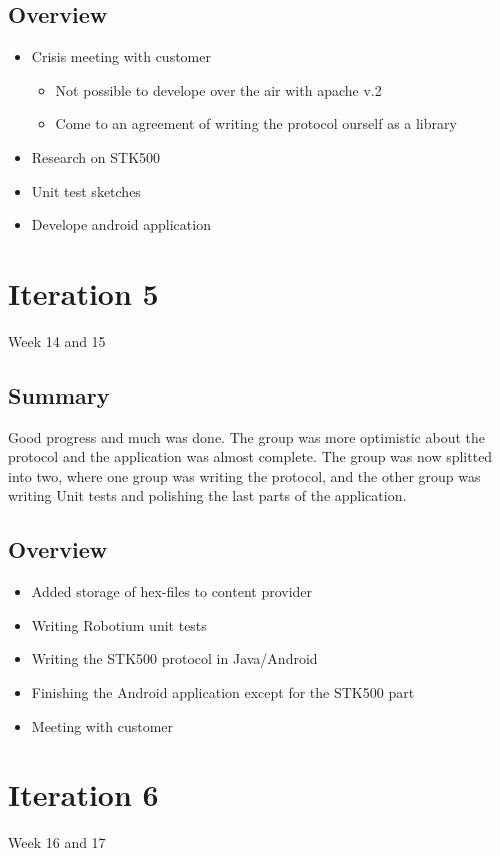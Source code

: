 \subsection{Overview}
\begin{itemize}
	\item{Crisis meeting with customer}
	\begin{itemize}
		\item{Not possible to develope over the air with apache v.2}
		\item{Come to an agreement of writing the protocol ourself as a library}
	\end{itemize}
	\item{Research on STK500}
	\item{Unit test sketches}
	\item{Develope android application}
\end{itemize}

\section{Iteration 5}
Week 14 and 15
\subsection{Summary}
	Good progress and much was done. The group was more optimistic about the protocol and the application was almost complete.
	The group was now splitted into two, where one group was writing the protocol, and the other group was writing Unit tests and polishing the last parts of the application.

\subsection{Overview}
\begin{itemize}
	\item{Added storage of hex-files to content provider}
	\item{Writing Robotium unit tests}
	\item{Writing the STK500 protocol in Java/Android}
	\item{Finishing the Android application except for the STK500 part}
	\item{Meeting with customer}
\end{itemize}

\section{Iteration 6}
Week 16 and 17


